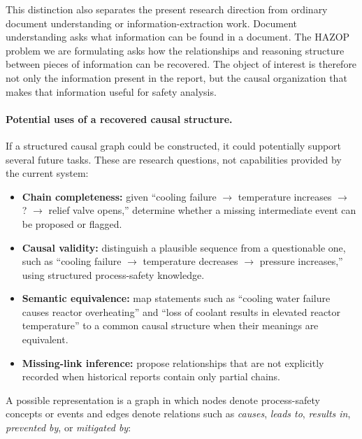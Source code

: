 This distinction also separates the present research direction from ordinary
document understanding or information-extraction work. Document understanding
asks what information can be found in a document. The HAZOP problem we are
formulating asks how the relationships and reasoning structure between pieces
of information can be recovered. The object of interest is therefore not only
the information present in the report, but the causal organization that makes
that information useful for safety analysis.

\paragraph{Potential uses of a recovered causal structure.}
If a structured causal graph could be constructed, it could potentially
support several future tasks. These are research questions, not capabilities
provided by the current system:

\begin{itemize}
  \item \textbf{Chain completeness:} given ``cooling failure $\rightarrow$
  temperature increases $\rightarrow$ ? $\rightarrow$ relief valve opens,''
  determine whether a missing intermediate event can be proposed or flagged.
  \item \textbf{Causal validity:} distinguish a plausible sequence from a
  questionable one, such as ``cooling failure $\rightarrow$ temperature
  decreases $\rightarrow$ pressure increases,'' using structured
  process-safety knowledge.
  \item \textbf{Semantic equivalence:} map statements such as ``cooling water
  failure causes reactor overheating'' and ``loss of coolant results in
  elevated reactor temperature'' to a common causal structure when their
  meanings are equivalent.
  \item \textbf{Missing-link inference:} propose relationships that are not
  explicitly recorded when historical reports contain only partial chains.
\end{itemize}

A possible representation is a graph in which nodes denote process-safety
concepts or events and edges denote relations such as \emph{causes},
\emph{leads to}, \emph{results in}, \emph{prevented by}, or \emph{mitigated
by}:

